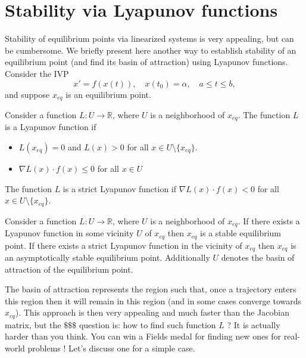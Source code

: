 \section{Stability via Lyapunov functions}

Stability of equilibrium points via linearized systems is very appealing, but can be cumbersome. We briefly present here another way to establish stability of an equilibrium point (and find its basin of attraction) using Lyapunov functions. Consider the IVP
\[ x' = f(x(t)) ,\quad x(t_0) = \alpha, \quad  a \leq t \leq b,\]
and suppose $x_{eq}$ is an equilibrium point. 
\begin{definition}\label{def:lyap}
Consider a function $L : U \to \mathbb{R}$, where $U$ is a neighborhood of $x_{eq}$. The function $L$ is a Lyapunov function if
\begin{itemize}
\item $L(x_{eq}) = 0$ and $L(x) >0$ for all $x \in U \setminus \lbrace x_{eq}\rbrace $.
\item $\nabla L(x) \cdot f(x) \leq 0$ for all $x \in U$
\end{itemize}
The function $L$ is a strict Lyapunov function if $\nabla L(x) \cdot f(x) < 0$ for all $x \in U \setminus \lbrace x_{eq}\rbrace $.
\end{definition}
\begin{lemma}
Consider a function $L : U \to \mathbb{R}$, where $U$ is a neighborhood of $x_{eq}$. If there exists a Lyapunov function in some vicinity $U$ of $x_{eq}$ then $x_{eq}$ is a stable equilibrium point. If there exists a strict Lyapunov function in the vicinity of $x_{eq}$ then $x_{eq}$ is an asymptotically stable equilibrium point. Additionally $U$ denotes the basin of attraction of the equilibrium point.
\end{lemma}
The basin of attraction represents the region such that, once a trajectory enters this region then it will remain in this region (and in some cases converge towards $x_{eq}$). This approach is then very appealing and much faster than the Jacobian matrix, but the $\$\$\$$ question is: how to find such function $L$ ? It is actually harder than you think. You can win a Fields medal for finding new ones for real-world problems ! Let's discuss one for a simple case.\\

